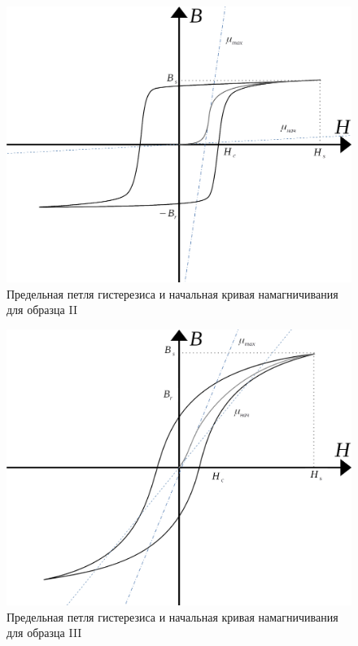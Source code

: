 \documentclass[a4paper,12pt]{article} %
\begin{document}
\begin{figure}
\begin{center}
\includegraphics[width=5in]{hist graph 2.png}
\caption{Предельная петля гистерезиса и начальная кривая намагничивания для образца II} 
\label{hist2}
\end{center}
\end{figure}

\begin{figure}
\begin{center}
\includegraphics[width=5in]{hist graph 3.png}
\caption{Предельная петля гистерезиса и начальная кривая намагничивания для образца III} 
\label{hist3}
\end{center}
\end{figure}
\end{document}
